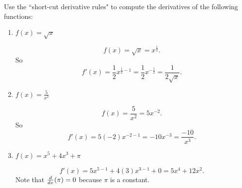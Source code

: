 \documentclass[nooutcomes]{ximera}
\begin{document}
\begin{problem}
Use the ``short-cut derivative rules" to compute the derivatives of the following functions:
	
	\begin{enumerate}
	
	\item $f(x) = \sqrt{x}$
	
		\begin{freeResponse}
		$$f(x) = \sqrt{x} = x^{\frac{1}{2}}.$$ 
		So 
		$$f'(x) = \frac{1}{2} x^{\frac{1}{2} - 1} = \frac{1}{2} x^{-\frac{1}{2}} = \frac{1}{2\sqrt{x}}.$$
		\end{freeResponse}
			
			
	
	\item $f(x) = \frac{5}{x^2}$
	
		\begin{freeResponse}
		$$f(x) = \frac{5}{x^2} = 5x^{-2}.$$  
		So 
		$$f'(x) = 5(-2) x^{-2-1} = -10x^{-3} = \frac{-10}{x^3}.$$  
		\end{freeResponse}
			
			
	
	\item $f(x) = x^5 + 4x^3 + \pi $
	
		\begin{freeResponse}
		$$f'(x) = 5x^{5-1} + 4(3)x^{3-1} + 0 = 5x^4 + 12x^2.$$  
		Note that $\frac{d}{dx} (\pi) = 0$ because $\pi$ is a constant.	
		\end{freeResponse}
			
			
	
	\end{enumerate}
\end{problem}
\end{document}

